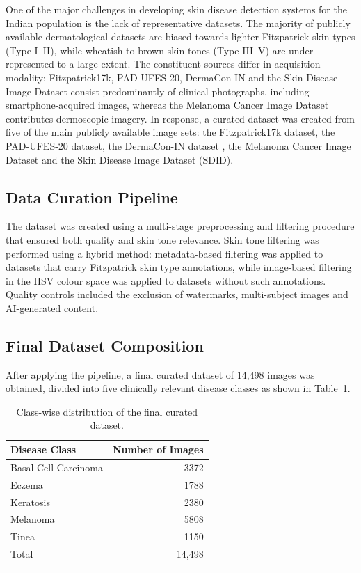 \documentclass[pdflatex,sn-mathphys-num]{sn-jnl}%
\begin{document}
One of the major challenges in developing skin disease detection systems for the Indian
population is the lack of representative datasets. The majority of publicly available
dermatological datasets are biased towards lighter Fitzpatrick skin types (Type I--II), while
wheatish to brown skin tones (Type III--V) are under-represented to a large extent. The
constituent sources differ in acquisition modality: Fitzpatrick17k, PAD-UFES-20, DermaCon-IN
and the Skin Disease Image Dataset consist predominantly of clinical photographs, including
smartphone-acquired images, whereas the Melanoma Cancer Image Dataset contributes dermoscopic
imagery. In response, a curated dataset was created from five of the main publicly available
image sets: the Fitzpatrick17k dataset, the PAD-UFES-20 dataset, the DermaCon-IN dataset
\cite{ref5}, the Melanoma Cancer Image Dataset and the Skin Disease Image Dataset (SDID).

\subsection{Data Curation Pipeline}

The dataset was created using a multi-stage preprocessing and filtering procedure that
ensured both quality and skin tone relevance. Skin tone filtering was performed using a
hybrid method: metadata-based filtering was applied to datasets that carry Fitzpatrick skin
type annotations, while image-based filtering in the HSV colour space was applied to datasets
without such annotations. Quality controls included the exclusion of watermarks,
multi-subject images and AI-generated content.

\subsection{Final Dataset Composition}

After applying the pipeline, a final curated dataset of 14,498 images was obtained, divided
into five clinically relevant disease classes as shown in Table~\ref{tab:dataset}.

\begin{table}[htbp]
\caption{Class-wise distribution of the final curated dataset.}\label{tab:dataset}
\begin{tabular}{@{}lr@{}}
\toprule
Disease Class & Number of Images \\
\midrule
Basal Cell Carcinoma & 3372 \\
Eczema & 1788 \\
Keratosis & 2380 \\
Melanoma & 5808 \\
Tinea & 1150 \\
\midrule
Total & 14,498 \\
\botrule
\end{tabular}
\end{table}
\end{document}
